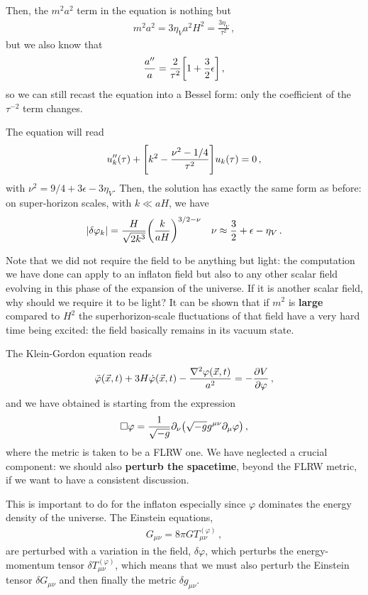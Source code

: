 \documentclass[main.tex]{subfiles}
\begin{document}
Then, the \(m^2 a^2\) term in the equation is nothing but 
%
\begin{align}
m^2 a^2 = 3 \eta _V a^2 H^2 = \frac{3 \eta _V}{\tau^2}
\,,
\end{align}
%
but we also know that 
%
\begin{align}
\frac{a''}{a} = \frac{2}{\tau^2 } \qty[ 1 + \frac{3}{2} \epsilon ]
\,,
\end{align}
%
so we can still recast the equation into a Bessel form: only the coefficient of the \(\tau^{-2}\) term changes. 

The equation will read 
%
\begin{align}
u''_k (\tau ) + \qty[ k^2 - \frac{\nu^2 - 1/4}{\tau^2}] u_k (\tau ) = 0
\,,
\end{align}
%
with \(\nu^2 = 9/4 + 3 \epsilon - 3 \eta _V\). 
Then, the solution has exactly the same form as before: on super-horizon scales, with \(k \ll aH\), we have
%
\begin{align}
\abs{ \delta \varphi _k} = \frac{H}{\sqrt{2 k^3}} \qty( \frac{k}{aH})^{3/2 - \nu }
&&
\nu \approx \frac{3}{2} + \epsilon - \eta _V
\,.
\end{align}

Note that we did not require the field to be anything but light: the computation we have done can apply to an inflaton field but also to any other scalar field evolving in this phase of the expansion of the universe. 
If it is another scalar field, why should we require it to be light? It can be shown that if \(m^2\) is \textbf{large} compared to \(H^2\) the superhorizon-scale fluctuations of that field have a very hard time being excited: the field basically remains in its vacuum state. 


The Klein-Gordon equation reads 
%
\begin{align}
\ddot{\varphi} (\vec{x}, t)
+ 3 H \dot{\varphi} (\vec{x}, t)
- \frac{\nabla^2 \varphi (\vec{x},t)}{a^2}
= - \pdv{V}{\varphi }
\,,
\end{align}
%
and we have obtained is starting from the expression 
%
\begin{align}
\square \varphi = \frac{1}{\sqrt{-g}} \partial_{\nu } \qty(\sqrt{-g} g^{\mu \nu } \partial_{\mu } \varphi )
\,,
\end{align}
%
where the metric is taken to be a FLRW one. We have neglected a crucial component: we should also \textbf{perturb the spacetime}, beyond the FLRW metric, if we want to have a consistent discussion. 

This is important to do for the inflaton especially since \(\varphi \) dominates the energy density of the universe. 
The Einstein equations, 
%
\begin{align}
G_{\mu \nu } = 8 \pi G T_{\mu \nu }^{(\varphi )}
\,,
\end{align}
%
are perturbed with a variation in the field, \(\delta \varphi \), which perturbs the energy-momentum tensor \(\delta T_{\mu \nu }^{(\varphi )}\), which means that we must also perturb the Einstein tensor \(\delta G_{\mu \nu} \) and then finally the metric \(\delta g_{\mu \nu }\). 
\end{document}
